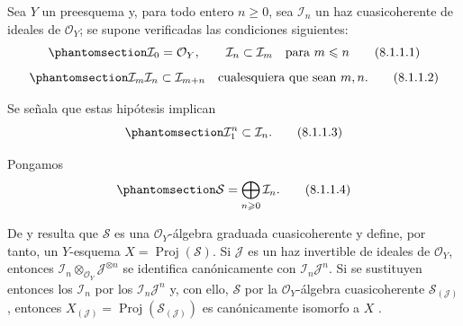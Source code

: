 \documentclass[oneside,10pt]{amsart}
\renewcommand{\leq}{\leqslant}
\renewcommand{\geq}{\geqslant}
\newcommand{\oldpage}[2][]{\marginnote{\normalfont\footnotesize\textbf{#1}~|~#2}\ignorespaces}
\let\EGAOriginalLabel\label
\renewcommand{\label}[1]{\phantomsection\EGAOriginalLabel{#1}}
\begin{document}
\begin{env}[8.1.1]
\label{II.8.1.1-fr}
Sea $Y$ un preesquema y, para todo entero $n\geq0$, sea $\mathcal{I}_n$ un haz cuasicoherente de ideales de $\mathcal{O}_Y$; se supone verificadas las condiciones siguientes:
\begin{equation}
\label{II.8.1.1.1-fr}
  \mathcal{I}_0=\mathcal{O}_Y,\qquad
  \mathcal{I}_n\subset\mathcal{I}_m\quad\text{para }m\leq n
\tag{8.1.1.1}
\end{equation}
\begin{equation}
\label{II.8.1.1.2-fr}
  \mathcal{I}_m\mathcal{I}_n\subset\mathcal{I}_{m+n}
  \quad\text{cualesquiera que sean }m,n.
\tag{8.1.1.2}
\end{equation}

\oldpage[II]{153}
Se señala que estas hipótesis implican
\begin{equation}
\label{II.8.1.1.3-fr}
  \mathcal{I}_1^n\subset\mathcal{I}_n.
\tag{8.1.1.3}
\end{equation}

Pongamos
\begin{equation}
\label{II.8.1.1.4-fr}
  \mathcal{S}=\bigoplus_{n\geq0}\mathcal{I}_n.
\tag{8.1.1.4}
\end{equation}

De  y  resulta que $\mathcal{S}$ es una $\mathcal{O}_Y$-álgebra graduada cuasicoherente y define, por tanto, un $Y$-esquema $X=\operatorname{Proj}(\mathcal{S})$.
Si $\mathcal{J}$ es un haz invertible de ideales de $\mathcal{O}_Y$, entonces $\mathcal{I}_n\otimes_{\mathcal{O}_Y}\mathcal{J}^{\otimes n}$ se identifica canónicamente con $\mathcal{I}_n\mathcal{J}^n$.
Si se sustituyen entonces los $\mathcal{I}_n$ por los $\mathcal{I}_n\mathcal{J}^n$ y, con ello, $\mathcal{S}$ por la $\mathcal{O}_Y$-álgebra cuasicoherente $\mathcal{S}_{(\mathcal{J})}$, entonces $X_{(\mathcal{J})}=\operatorname{Proj}(\mathcal{S}_{(\mathcal{J})})$ es canónicamente isomorfo a $X$ .
\end{env}
\end{document}
